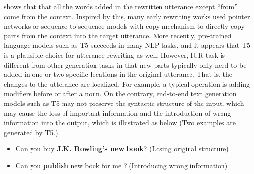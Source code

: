  shows that that all the words added in 
the rewritten utterance except ``from'' come from the context. 
Inspired by this, many early rewriting works used 
pointer networks \citep{NIPS2015_29921001} or sequence to sequence models with copy 
mechanism \citep{gu-etal-2016-incorporating, see-etal-2017-get} to 
directly copy parts from the context into the target utterance. 
More recently, pre-trained language models such as T5 \citep{2020t5} 
succeeds %
in many NLP tasks, and it appears that T5 is a plausible choice for
utterance rewriting as well.
However, IUR task is different from other generation tasks 
in that new parts typically only need to be 
added in one or two specific locations in the original utterance.
That is, the changes to the utterance are localized.
For example, a typical operation is adding modifiers before or after 
a noun.
On the contrary, end-to-end text generation models such as T5 may 
not preserve the syntactic structure of the input, which
may cause the loss of important information
and the introduction of wrong information into the output,
which is illustrated as below (Two examples are generated by T5.).

\begin{itemize}
\item Can you buy \textbf{J.K. Rowling's new book}? (Losing original structure)
\item Can you \textbf{publish} new book for me ? (Introducing wrong information)
\end{itemize}

